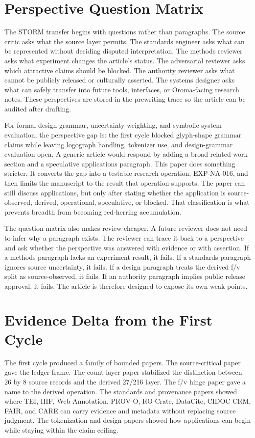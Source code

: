 \documentclass[sigconf,nonacm]{acmart}
\begin{document}
\section{Perspective Question Matrix}
The STORM transfer begins with questions rather than paragraphs. The source
critic asks what the source layer permits. The standards engineer asks what can
be represented without deciding disputed interpretation. The methods reviewer
asks what experiment changes the article's status. The adversarial reviewer asks
which attractive claims should be blocked. The authority reviewer asks what
cannot be publicly released or culturally asserted. The systems designer asks
what can safely transfer into future tools, interfaces, or Oroma-facing
research notes. These perspectives are stored in the prewriting trace so the
article can be audited after drafting.

For formal design grammar, uncertainty weighting, and symbolic system evaluation, the perspective gap is: the first cycle blocked glyph-shape grammar claims while leaving logograph handling, tokenizer use, and design-grammar evaluation open. A generic article would respond by
adding a broad related-work section and a speculative applications paragraph.
This paper does something stricter. It converts the gap into a testable
research operation, EXP-NA-016, and then limits the manuscript to the result
that operation supports. The paper can still discuss applications, but only
after stating whether the application is source-observed, derived, operational,
speculative, or blocked. That classification is what prevents breadth from
becoming red-herring accumulation.

The question matrix also makes review cheaper. A future reviewer does not need
to infer why a paragraph exists. The reviewer can trace it back to a perspective
and ask whether the perspective was answered with evidence or with assertion.
If a methods paragraph lacks an experiment result, it fails. If a standards
paragraph ignores source uncertainty, it fails. If a design paragraph treats the
derived f/v split as source-observed, it fails. If an authority paragraph implies
public release approval, it fails. The article is therefore designed to expose
its own weak points.

\section{Evidence Delta from the First Cycle}
The first cycle produced a family of bounded papers. The source-critical paper
gave the ledger frame. The count-layer paper stabilized the distinction between
26 by 8 source records and the derived 27/216 layer. The f/v hinge paper gave a
name to the derived operation. The standards and provenance papers showed where
TEI, IIIF, Web Annotation, PROV-O, RO-Crate, DataCite, CIDOC CRM, FAIR, and CARE
can carry evidence and metadata without replacing source judgment. The
tokenization and design papers showed how applications can begin while staying
within the claim ceiling.
\end{document}
